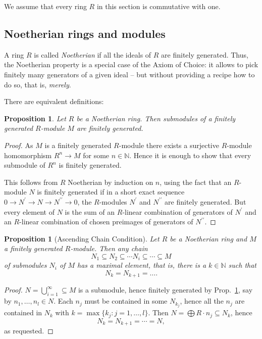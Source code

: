 \documentclass{amsart}
\theoremstyle{plain}
\numberwithin{equation}{section} %
\numberwithin{figure}{section} %
\theoremstyle{plain}
\theoremstyle{plain}
\theoremstyle{plain}
\theoremstyle{plain}
\theoremstyle{plain}
\newtheorem{prop}[thm]{Proposition} %
\theoremstyle{plain}
\theoremstyle{remark}
\theoremstyle{remark}
\theoremstyle{remark}
\begin{document}
We assume that every ring $R$ in this section is commutative with one.

\subsection{Noetherian rings and modules}

A ring $R$ is called \textit{Noetherian} if all the ideals of $R$ are finitely generated. Thus, the Noetherian property is a special case of the Axiom of Choice: it allows to pick finitely many generators of a given ideal -- but without providing a recipe how to do so, that is, \textit{merely}.

There are equivalent definitions:
\begin{prop} \label{Noether-submodule-prop}
Let $R$ be a Noetherian ring. Then submodules of a finitely generated $R$-module $M$ are finitely generated.
\end{prop}
\begin{proof}
As $M$ is a finitely generated $R$-module there exists a surjective $R$-module homomorphism $R^n \rightarrow M$ for some $n \in \mathbb{N}$. Hence it is enough to show that every submodule of $R^n$ is finitely generated.

This follows from $R$ Noetherian by induction on $n$, using the fact that an $R$-module $N$ is finitely generated if in a short exact sequence $0 \rightarrow N^\prime \rightarrow N \rightarrow N^{\prime\prime} \rightarrow 0$, the $R$-modules $N^\prime$ and $N^{\prime\prime}$ are finitely generated. But every element of $N$ is the sum of an $R$-linear combination of generators of $N^\prime$ and an $R$-linear combination of chosen preimages of generators of $N^{\prime\prime}$.
\end{proof}
\begin{prop}[Ascending Chain Condition]
Let $R$ be a Noetherian ring and $M$ a finitely generated $R$-module. Then any chain 
\[ N_1 \subseteq N_2 \subseteq \cdots N_i \subseteq \cdots \subseteq M \]
of submodules $N_i$ of $M$ has a \textit{maximal} element, that is, there is a $k \in \mathbb{N}$ such that
\[ N_k = N_{k+1} = \ldots. \]
\end{prop}
\begin{proof}
$N = \bigcup_{i=1}^\infty \subseteq M$ is a submodule, hence finitely generated by Prop.~\ref{Noether-submodule-prop}, say by $n_1, \ldots, n_l \in N$. Each $n_j$ must be contained in some $N_{k_j}$, hence all the $n_j$ are contained in $N_k$ with $k = \max \{k_j : j = 1,\ldots, l\}$. Then $N = \bigoplus R \cdot n_j \subseteq N_k$, hence
\[ N_k = N_{k+1} = \cdots = N, \]
as requested.
\end{proof}
\end{document}
